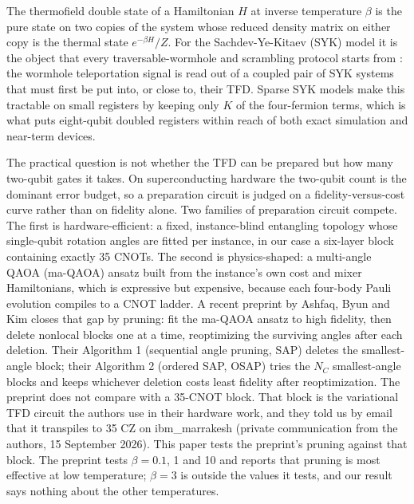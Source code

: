 \documentclass[11pt]{article}
\begin{document}
The thermofield double state of a Hamiltonian $H$ at inverse temperature $\beta$ is the pure state on two copies of the system whose reduced density matrix on either copy is the thermal state $e^{-\beta H}/Z$. For the Sachdev-Ye-Kitaev (SYK) model \cite{sachdev1993,maldacena2016} it is the object that every traversable-wormhole and scrambling protocol starts from \cite{gao2017,maldacena2018,jafferis2022}: the wormhole teleportation signal is read out of a coupled pair of SYK systems that must first be put into, or close to, their TFD. Sparse SYK models \cite{xu2020,tezuka2023} make this tractable on small registers by keeping only $K$ of the four-fermion terms, which is what puts eight-qubit doubled registers within reach of both exact simulation and near-term devices.

The practical question is not whether the TFD can be prepared but how many two-qubit gates it takes. On superconducting hardware the two-qubit count is the dominant error budget, so a preparation circuit is judged on a fidelity-versus-cost curve rather than on fidelity alone. Two families of preparation circuit compete. The first is hardware-efficient: a fixed, instance-blind entangling topology whose single-qubit rotation angles are fitted per instance, in our case a six-layer block containing exactly 35 CNOTs. The second is physics-shaped: a multi-angle QAOA (ma-QAOA) ansatz \cite{herrman2022,farhi2014} built from the instance's own cost and mixer Hamiltonians, which is expressive but expensive, because each four-body Pauli evolution compiles to a CNOT ladder. A recent preprint by Ashfaq, Byun and Kim \cite{gist2026} closes that gap by pruning: fit the ma-QAOA ansatz to high fidelity, then delete nonlocal blocks one at a time, reoptimizing the surviving angles after each deletion. Their Algorithm 1 (sequential angle pruning, SAP) deletes the smallest-angle block; their Algorithm 2 (ordered SAP, OSAP) tries the $N_C$ smallest-angle blocks and keeps whichever deletion costs least fidelity after reoptimization. The preprint does not compare with a 35-CNOT block. That block is the variational TFD circuit the authors use in their hardware work, and they told us by email that it transpiles to 35 CZ on ibm\_marrakesh (private communication from the authors, 15 September 2026). This paper tests the preprint's pruning against that block. The preprint tests $\beta = 0.1$, 1 and 10 and reports that pruning is most effective at low temperature; $\beta = 3$ is outside the values it tests, and our result says nothing about the other temperatures.
\end{document}
